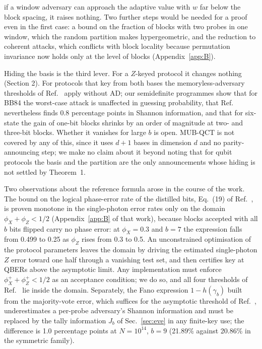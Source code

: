 \documentclass[aps,pra,twocolumn,superscriptaddress,nofootinbib]{revtex4-2}
\begin{document}
if a window adversary can approach the adaptive value with $w$ far below the block spacing, it raises nothing. Two further steps would be needed for a proof even in the first case: a bound on the fraction of blocks with two probes in one window, which the random partition makes hypergeometric, and the reduction to coherent attacks, which conflicts with block locality because permutation invariance now holds only at the level of blocks (Appendix~\ref{app:B}).

Hiding the basis is the third lever. For a $Z$-keyed protocol it changes nothing (Section 2). For protocols that key from both bases the memoryless-adversary thresholds of Ref.~\cite{BAL11} apply without AD; our semidefinite programmes show that for BB84 the worst-case attack is unaffected in guessing probability, that Ref.~\cite{BAL11} nevertheless finds 0.8 percentage points in Shannon information, and that for six-state the gain of one-bit blocks shrinks by an order of magnitude at two- and three-bit blocks. Whether it vanishes for large $b$ is open. MUB-QCT \cite{VA20} is not covered by any of this, since it uses $d+1$ bases in dimension $d$ and no parity-announcing step; we make no claim about it beyond noting that for qubit protocols the basis and the partition are the only announcements whose hiding is not settled by Theorem~1.

Two observations about the reference formula arose in the course of the work. The bound on the logical phase-error rate of the distilled bits, Eq.~(19) of Ref.~\cite{T25}, is proven monotone in the single-photon error rates only on the domain $\phi_X+\phi_Z<1/2$ (Appendix~\ref{app:B} of that work), because blocks accepted with all $b$ bits flipped carry no phase error: at $\phi_X=0.3$ and $b=7$ the expression falls from 0.499 to 0.25 as $\phi_Z$ rises from 0.3 to 0.5. An unconstrained optimisation of the protocol parameters leaves the domain by driving the estimated single-photon $Z$ error toward one half through a vanishing test set, and then certifies key at QBERs above the asymptotic limit. Any implementation must enforce $\phi_X^++\phi_Z^+<1/2$ as an acceptance condition; we do so, and all four thresholds of Ref.~\cite{T25} lie inside the domain. Separately, the Fano expression $1-h(\gamma_b)$ built from the majority-vote error, which suffices for the asymptotic threshold of Ref.~\cite{GW99}, underestimates a per-probe adversary's Shannon information and must be replaced by the tally information $J_b$ of Sec.~\ref{sec:eve} in any finite-key use; the difference is 1.0 percentage points at $N=10^{14}$, $b=9$ (21.89\% against 20.86\% in the symmetric family).
\end{document}
